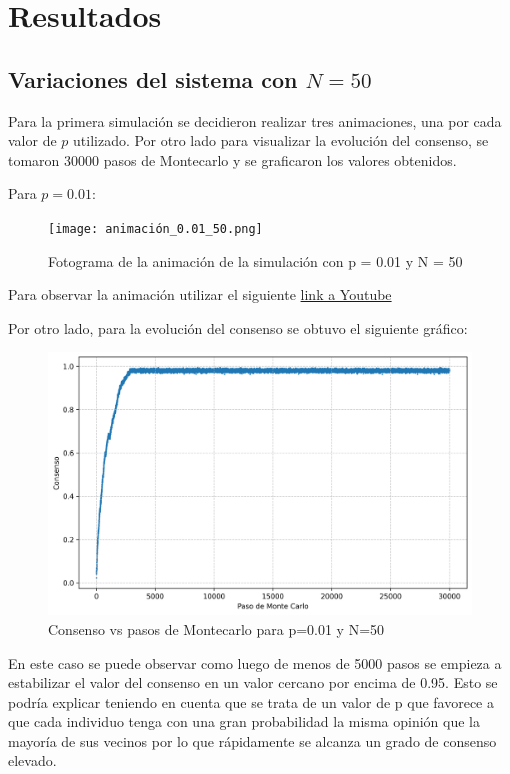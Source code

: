\documentclass[12pt]{article}
\begin{document}
\section{Resultados}
\subsection{Variaciones del sistema con $N = 50$}
Para la primera simulación se decidieron realizar tres animaciones, una por cada valor de $p$ utilizado. Por otro lado para visualizar la evolución del consenso, se tomaron 30000 pasos de Montecarlo y se graficaron los valores obtenidos.

Para $p = 0.01$:

\begin{figure}[H]
    \centering
    \texttt{[image: animación\_0.01\_50.png]} 
    \caption{Fotograma de la animación de la simulación con p = 0.01 y N = 50}
\end{figure}

Para observar la animación utilizar el siguiente \href{https://www.youtube.com/watch?v=dQw4w9WgXcQ}{link a Youtube}

Por otro lado, para la evolución del consenso se obtuvo el siguiente gráfico:
\begin{figure}[H]
    \centering
    \includegraphics[width=1\textwidth]{consensus_evolution_n_50_p_0.01.png} 
    \caption{Consenso vs pasos de Montecarlo para p=0.01 y N=50}
\end{figure}

En este caso se puede observar como luego de menos de 5000 pasos se empieza a estabilizar el valor del consenso en un valor cercano por encima de 0.95. Esto se podría explicar teniendo en cuenta que se trata de un valor de p que favorece a que cada individuo tenga con una gran probabilidad la misma opinión que la mayoría de sus vecinos por lo que rápidamente se alcanza un grado de consenso elevado.
\end{document}
